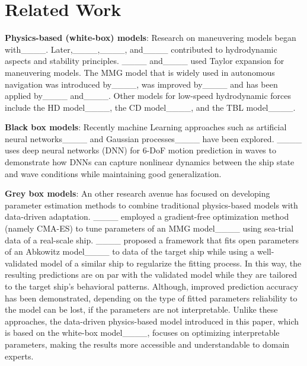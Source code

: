 \section{Related Work}
\label{sec:related_Work}

\textbf{Physics-based (white-box) models}:
Research on maneuvering models began with____. Later,____,____, and____ contributed to hydrodynamic aspects and stability principles. ____ and____ used Taylor expansion for maneuvering models. The MMG model that is widely used in autonomous navigation was introduced by____, was improved by____ and has been applied by____ and____. Other models for low-speed hydrodynamic forces include the HD model____, the CD model____, and the TBL model____.

\textbf{Black box models}: Recently machine Learning approaches such as   artificial neural networks____ and Gaussian processes____ have been explored. ____ uses deep neural networks (DNN) for 6-DoF motion prediction in waves to demonstrate how DNNs can capture nonlinear dynamics between the ship state and wave conditions while maintaining good generalization.

\textbf{Grey box models}:
An other research avenue has focused on developing parameter estimation methods to combine traditional physics-based models with data-driven adaptation.
____ employed a gradient-free optimization method (namely CMA-ES) to tune parameters of an MMG model____ using sea-trial data of a real-scale ship. 
____ proposed a framework that 
fits open parameters of an Abkowitz model____ to data of the target ship while using a well-validated model of a similar ship to regularize the fitting process. In this way, the resulting predictions are on par with the validated model while they are tailored to the target ship's behavioral patterns. 
Although, improved prediction accuracy has been demonstrated, depending on the type of fitted parameters reliability to the model can be lost, if the parameters are not interpretable.
Unlike these approaches, the data-driven physics-based model introduced in this paper, which is based on the white-box model____, focuses on optimizing interpretable parameters, making the results more accessible and understandable to domain experts.   \vspace{-4mm}





